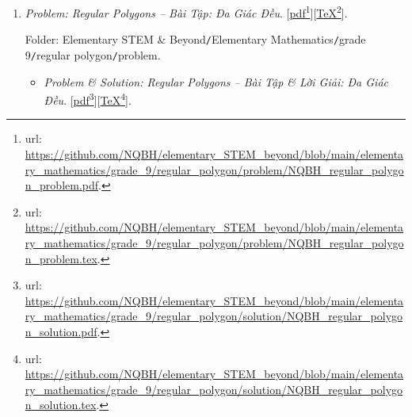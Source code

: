 \documentclass[12pt,oneside]{book}
\begin{document}
\begin{enumerate}
	Folder: {\sf Elementary STEM \& Beyond{\tt/}Elementary Mathematics{\tt/}grade 9{\tt/}circumcircle \& incircle{\tt/}problem}.
	\begin{itemize}
		\item {\it Problem \& Solution: Circumcircle \& Incircle -- Bài Tập \& Lời Giải: Đường Tròn Ngoại Tiếp \& Đường Tròn Nội Tiếp}. [\href{https://github.com/NQBH/elementary_STEM_beyond/blob/main/elementary_mathematics/grade_9/circumcircle_incircle/solution/NQBH_circumcircle_incircle_solution.pdf}{pdf}\footnote{{\sc url}: \url{https://github.com/NQBH/elementary_STEM_beyond/blob/main/elementary_mathematics/grade_9/circumcircle_incircle/solution/NQBH_circumcircle_incircle_solution.pdf}.}][\href{https://github.com/NQBH/elementary_STEM_beyond/blob/main/elementary_mathematics/grade_9/circumcircle_incircle/solution/NQBH_circumcircle_incircle_solution.tex}{\TeX}\footnote{{\sc url}: \url{https://github.com/NQBH/elementary_STEM_beyond/blob/main/elementary_mathematics/grade_9/circumcircle_incircle/solution/NQBH_circumcircle_incircle_solution.tex}.}].
		
		Folder: {\sf Elementary STEM \& Beyond{\tt/}Elementary Mathematics{\tt/}grade 9{\tt/}circumcircle \& incircle{\tt/}solution}.
	\end{itemize}
	\item {\it Problem: Regular Polygons -- Bài Tập: Đa Giác Đều}. [\href{https://github.com/NQBH/elementary_STEM_beyond/blob/main/elementary_mathematics/grade_9/regular_polygon/problem/NQBH_regular_polygon_problem.pdf}{pdf}\footnote{{\sc url}: \url{https://github.com/NQBH/elementary_STEM_beyond/blob/main/elementary_mathematics/grade_9/regular_polygon/problem/NQBH_regular_polygon_problem.pdf}.}][\href{https://github.com/NQBH/elementary_STEM_beyond/blob/main/elementary_mathematics/grade_9/regular_polygon/problem/NQBH_regular_polygon_problem.tex}{\TeX}\footnote{{\sc url}: \url{https://github.com/NQBH/elementary_STEM_beyond/blob/main/elementary_mathematics/grade_9/regular_polygon/problem/NQBH_regular_polygon_problem.tex}.}].
	
	Folder: {\sf Elementary STEM \& Beyond{\tt/}Elementary Mathematics{\tt/}grade 9{\tt/}regular polygon{\tt/}problem}.
	\begin{itemize}
		\item {\it Problem \& Solution: Regular Polygons -- Bài Tập \& Lời Giải: Đa Giác Đều}. [\href{https://github.com/NQBH/elementary_STEM_beyond/blob/main/elementary_mathematics/grade_9/regular_polygon/solution/NQBH_regular_polygon_solution.pdf}{pdf}\footnote{{\sc url}: \url{https://github.com/NQBH/elementary_STEM_beyond/blob/main/elementary_mathematics/grade_9/regular_polygon/solution/NQBH_regular_polygon_solution.pdf}.}][\href{https://github.com/NQBH/elementary_STEM_beyond/blob/main/elementary_mathematics/grade_9/regular_polygon/solution/NQBH_regular_polygon_solution.tex}{\TeX}\footnote{{\sc url}: \url{https://github.com/NQBH/elementary_STEM_beyond/blob/main/elementary_mathematics/grade_9/regular_polygon/solution/NQBH_regular_polygon_solution.tex}.}].
		

\end{itemize}
\end{enumerate}
\end{document}
